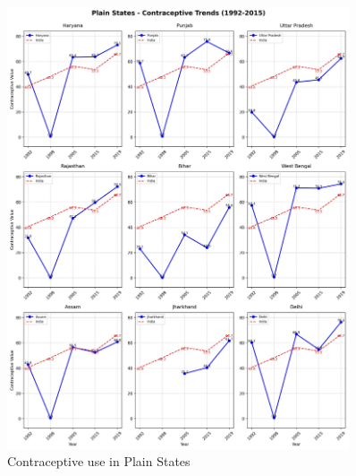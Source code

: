 \begin{figure}[H]
    \centering
    \includegraphics[width=0.9\textwidth]{figures/nfhs/plain_states_contraceptive_subplots.pdf}
    \caption{Contraceptive use in Plain States}
    \label{fig:nfhs_plain_contraceptive}
\end{figure}

